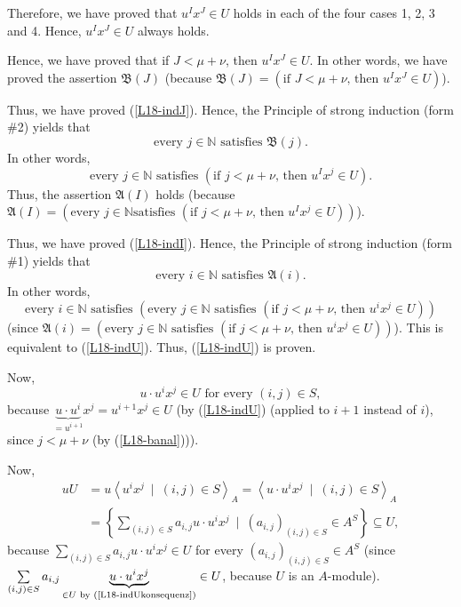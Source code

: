 \documentclass[12pt,final,notitlepage,onecolumn]{article}%
\begin{document}
Therefore, we have proved that $u^{I}x^{J}\in U$ holds in each of the four
cases 1, 2, 3 and 4. Hence, $u^{I}x^{J}\in U$ always holds.

Hence, we have proved that if $J<\mu+\nu$, then $u^{I}x^{J}\in U$. In other
words, we have proved the assertion $\mathfrak{B}\left(  J\right)  $ (because
$\mathfrak{B}\left(  J\right)  =\left(  \text{if }J<\mu+\nu\text{, then }%
u^{I}x^{J}\in U\right)  $).

Thus, we have proved (\ref{L18-indJ}). Hence, the Principle of strong
induction (form \#2) yields that%
\[
\text{every }j\in\mathbb{N}\text{ satisfies }\mathfrak{B}\left(  j\right)
\text{.}%
\]
In other words,%
\[
\text{every }j\in\mathbb{N}\text{ satisfies }\left(  \text{if }j<\mu
+\nu\text{, then }u^{I}x^{j}\in U\right)  .
\]
Thus, the assertion $\mathfrak{A}\left(  I\right)  $ holds (because
$\mathfrak{A}\left(  I\right)  =\left(  \text{every }j\in\mathbb{N}\text{
satisfies }\left(  \text{if }j<\mu+\nu\text{, then }u^{I}x^{j}\in U\right)
\right)  $).

Thus, we have proved (\ref{L18-indI}). Hence, the Principle of strong
induction (form \#1) yields that%
\[
\text{every }i\in\mathbb{N}\text{ satisfies }\mathfrak{A}\left(  i\right)
\text{.}%
\]
In other words,%
\[
\text{every }i\in\mathbb{N}\text{ satisfies }\left(  \text{every }%
j\in\mathbb{N}\text{ satisfies }\left(  \text{if }j<\mu+\nu\text{, then }%
u^{i}x^{j}\in U\right)  \right)
\]
(since $\mathfrak{A}\left(  i\right)  =\left(  \text{every }j\in
\mathbb{N}\text{ satisfies }\left(  \text{if }j<\mu+\nu\text{, then }%
u^{i}x^{j}\in U\right)  \right)  $). This is equivalent to (\ref{L18-indU}).
Thus, (\ref{L18-indU}) is proven.

Now,%
\begin{equation}
u\cdot u^{i}x^{j}\in U\text{ for every }\left(  i,j\right)  \in S,
\label{L18-indUkonsequenz}%
\end{equation}
because $\underbrace{u\cdot u^{i}}_{=u^{i+1}}x^{j}=u^{i+1}x^{j}\in U$ (by
(\ref{L18-indU}) (applied to $i+1$ instead of $i$), since $j<\mu+\nu$ (by
(\ref{L18-banal}))).

Now,%
\begin{align*}
uU  &  =u\left\langle u^{i}x^{j}\ \mid\ \left(  i,j\right)  \in S\right\rangle
_{A}=\left\langle u\cdot u^{i}x^{j}\ \mid\ \left(  i,j\right)  \in
S\right\rangle _{A}\\
&  =\left\{  \sum\limits_{\left(  i,j\right)  \in S}a_{i,j}u\cdot u^{i}%
x^{j}\ \mid\ \left(  a_{i,j}\right)  _{\left(  i,j\right)  \in S}\in
A^{S}\right\}  \subseteq U,
\end{align*}
because $\sum\limits_{\left(  i,j\right)  \in S}a_{i,j}u\cdot u^{i}x^{j}\in U$
for every $\left(  a_{i,j}\right)  _{\left(  i,j\right)  \in S}\in A^{S}$
(since $\sum\limits_{\left(  i,j\right)  \in S}a_{i,j}\underbrace{u\cdot
u^{i}x^{j}}_{\in U\text{ by (\ref{L18-indUkonsequenz})}}\in U$, because $U$ is
an $A$-module).
\end{document}
